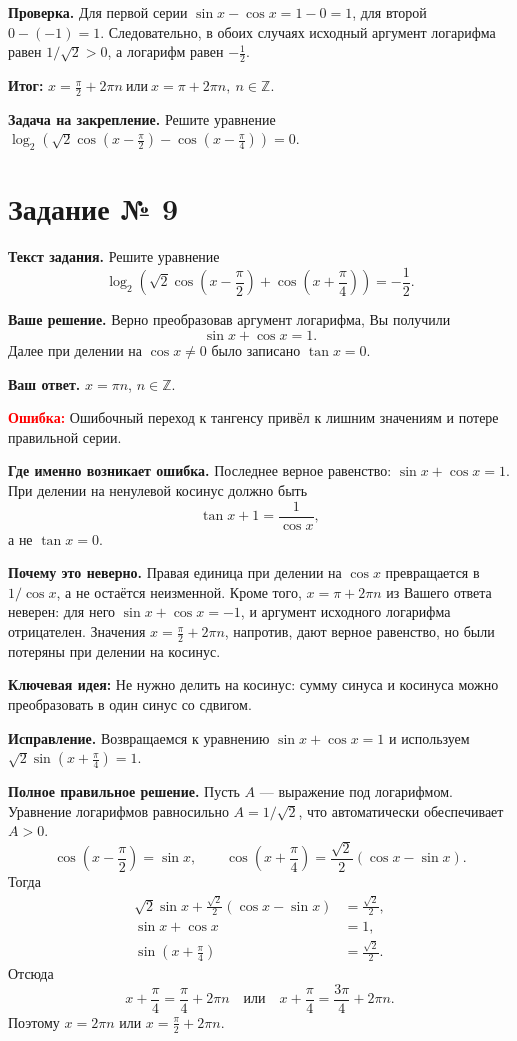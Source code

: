 \documentclass[12pt,a4paper]{article}
\newcommand{\err}{\textcolor{red}{Ошибка:}}
\newcommand{\idea}{\textcolor{blue!60!black}{Ключевая идея:}}
\newcommand{\result}{\textcolor{teal!60!black}{Итог:}}
\begin{document}
\textbf{Проверка.} Для первой серии $\sin x-\cos x=1-0=1$, для второй $0-(-1)=1$. Следовательно, в обоих случаях исходный аргумент логарифма равен $1/\sqrt2>0$, а логарифм равен $-\frac12$.

\textbf{\result} $\boxed{x=\frac\pi2+2\pi n\ \text{или}\ x=\pi+2\pi n,\ n\in\mathbb Z.}$

\textbf{Задача на закрепление.} Решите уравнение $\log_2\left(\sqrt2\cos(x-\frac\pi2)-\cos(x-\frac\pi4)\right)=0$.

\newpage
{}\label{task:9}
\section*{Задание № 9}
\textbf{Текст задания.} Решите уравнение
\[\log_2\left(\sqrt2\cos\left(x-\frac\pi2\right)+\cos\left(x+\frac\pi4\right)\right)=-\frac12.\]

\textbf{Ваше решение.} Верно преобразовав аргумент логарифма, Вы получили
\[\sin x+\cos x=1.\]
Далее при делении на $\cos x\ne0$ было записано $\tan x=0$.

\textbf{Ваш ответ.} $x=\pi n$, $n\in\mathbb Z$.

\textbf{\err} Ошибочный переход к тангенсу привёл к лишним значениям и потере правильной серии.

\textbf{Где именно возникает ошибка.} Последнее верное равенство: $\sin x+\cos x=1$. При делении на ненулевой косинус должно быть
\[\tan x+1=\frac1{\cos x},\]
а не $\tan x=0$.

\textbf{Почему это неверно.} Правая единица при делении на $\cos x$ превращается в $1/\cos x$, а не остаётся неизменной. Кроме того, $x=\pi+2\pi n$ из Вашего ответа неверен: для него $\sin x+\cos x=-1$, и аргумент исходного логарифма отрицателен. Значения $x=\frac\pi2+2\pi n$, напротив, дают верное равенство, но были потеряны при делении на косинус.

\textbf{\idea} Не нужно делить на косинус: сумму синуса и косинуса можно преобразовать в один синус со сдвигом.

\textbf{Исправление.} Возвращаемся к уравнению $\sin x+\cos x=1$ и используем $\sqrt2\sin(x+\frac\pi4)=1$.

\textbf{Полное правильное решение.} Пусть $A$ --- выражение под логарифмом. Уравнение логарифмов равносильно $A=1/\sqrt2$, что автоматически обеспечивает $A>0$.
\[\cos\left(x-\frac\pi2\right)=\sin x,\qquad
\cos\left(x+\frac\pi4\right)=\frac{\sqrt2}{2}(\cos x-\sin x).\]
Тогда
\begin{align*}
\sqrt2\sin x+\frac{\sqrt2}{2}(\cos x-\sin x)&=\frac{\sqrt2}{2},\\
\sin x+\cos x&=1,\\
\sin\left(x+\frac\pi4\right)&=\frac{\sqrt2}{2}.
\end{align*}
Отсюда
\[x+\frac\pi4=\frac\pi4+2\pi n\quad\text{или}\quad
x+\frac\pi4=\frac{3\pi}{4}+2\pi n.\]
Поэтому $x=2\pi n$ или $x=\frac\pi2+2\pi n$.
\end{document}
